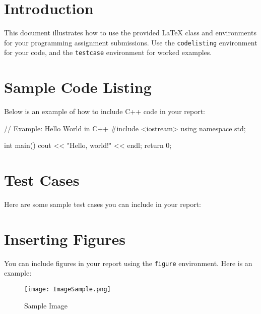 \documentclass{style}
\begin{document}
\section{Introduction}
This document illustrates how to use the provided LaTeX class and environments for your programming assignment submissions. Use the \texttt{codelisting} environment for your code, and the \texttt{testcase} environment for worked examples.

\section{Sample Code Listing}
Below is an example of how to include C++ code in your report:

\begin{codelisting}
// Example: Hello World in C++
#include <iostream>
using namespace std;

int main() {
    cout << "Hello, world!" << endl;
    return 0;
}
\end{codelisting}

\section{Test Cases}
Here are some sample test cases you can include in your report:
\begin{testcase}
\end{testcase}

\section{Inserting Figures}
You can include figures in your report using the \texttt{figure} environment. Here is an example:   
\begin{figure}[h]
    \centering
    \texttt{[image: ImageSample.png]} %
    \caption{Sample Image}
    \label{fig:sample-figure}
\end{figure}
\end{document}
